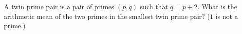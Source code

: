 A twin prime pair is a pair of primes $(p,q)$ such that $q=p+2$. What is the arithmetic mean of the two primes in the smallest twin prime pair? ($1$ is not a prime.)
